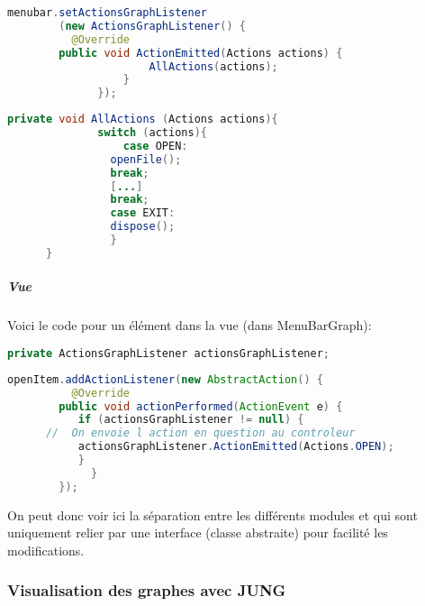 \documentclass[french]{article}
\begin{document}
      \begin{lstlisting}[backgroundcolor={\color{lgray}},breaklines=true,language=Java,tabsize=5]
      menubar.setActionsGraphListener
      	(new ActionsGraphListener() {
          @Override             
      	public void ActionEmitted(Actions actions) {
                      AllActions(actions);
                  }
              });
      \end{lstlisting}


      \begin{lstlisting}[backgroundcolor={\color{lgray}},language=Java]
      private void AllActions (Actions actions){
              switch (actions){
                  case OPEN:                 
      			openFile();                 
      			break;             
      			[...]               
      			break;             
      			case EXIT:                 
      			dispose();                 
      			}
      }
      \end{lstlisting}



    \subparagraph*{Vue}

      Voici le code pour un élément dans la vue (dans MenuBarGraph):

      \begin{lstlisting}[backgroundcolor={\color{lgray}},language=Java]
      private ActionsGraphListener actionsGraphListener;
      \end{lstlisting}


      \begin{lstlisting}[backgroundcolor={\color{lgray}},breaklines=true,language=Java]
      openItem.addActionListener(new AbstractAction() { 
          @Override             
      	public void actionPerformed(ActionEvent e) {     
           if (actionsGraphListener != null) { 
      //  On envoie l action en question au controleur
           actionsGraphListener.ActionEmitted(Actions.OPEN);   
           }     
             }      
        });
      \end{lstlisting}
      
On peut donc voir ici la séparation entre les différents modules et qui sont uniquement relier par une interface (classe abstraite) pour facilité les modifications.


  \subsubsection*{Visualisation des graphes avec JUNG}
\end{document}
